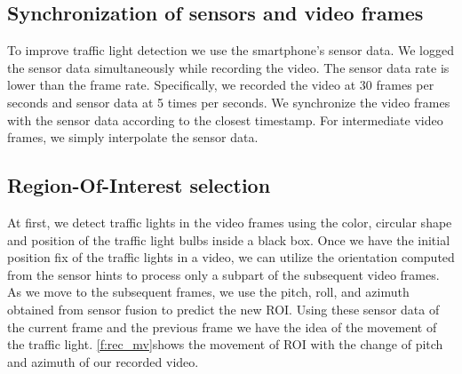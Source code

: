 \subsection{Synchronization of sensors and video frames}
To improve traffic light detection we use the smartphone's sensor data.
We logged the sensor data simultaneously while recording the video.
The sensor data rate is lower than the frame rate. 
Specifically, we recorded the video at 30 frames per seconds and sensor data at 5 times per seconds. 
We synchronize the video frames with the sensor data according to the closest timestamp.
For intermediate video frames, we simply interpolate the sensor data.



\subsection{Region-Of-Interest selection}
\label{s:roi}
At first, we detect traffic lights in the video frames using the color, circular shape and position of the traffic light bulbs inside a black box.
Once we have the initial position fix of the traffic lights in a video, we can utilize the orientation computed from the sensor hints to process only a subpart of the subsequent video frames. 
As we move to the subsequent frames, we use the pitch, roll, and azimuth obtained from sensor fusion to predict the new ROI.
Using these sensor data of the current frame and the previous frame we have the idea of the movement of the traffic light.
\ref{f:rec_mv}shows the movement of ROI with the change of pitch and azimuth of our recorded video.

